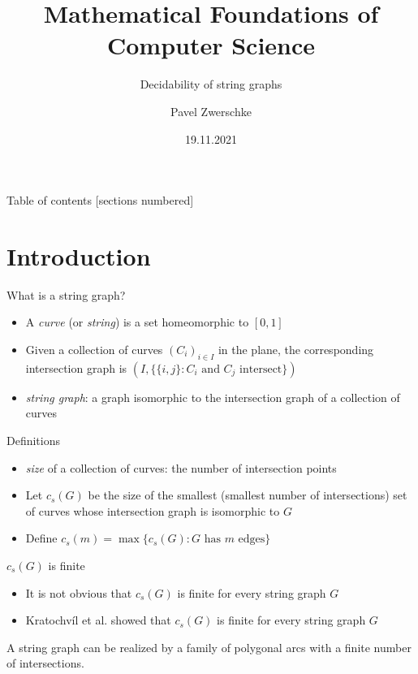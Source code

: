 \documentclass[10pt,aspectratio=169]{beamer}
\title{Mathematical Foundations of Computer Science}
\subtitle{Decidability of string graphs}
\date{19.11.2021}
\author{Pavel Zwerschke}
\institute{Radboud University Nijmegen}
\theoremstyle{plain} %
\theoremstyle{remark} %
\newcommand{\set}[1]{\{#1\}}
\begin{document}
\maketitle

\begin{frame}{Table of contents}
    [sections numbered]
    \tableofcontents%
\end{frame}

\section{Introduction}

\begin{frame}{What is a string graph?}
    \begin{itemize}
        \item A \textit{curve} (or \textit{string}) is a set homeomorphic to \([0,1]\)
        \item Given a collection of curves \((C_i)_{i \in I}\) in the plane, the corresponding intersection graph is \( (I, \set{\set{i, j} : C_i \text{ and } C_j \text{ intersect}}) \)
        \item \textit{string graph}: a graph isomorphic to the intersection graph of a collection of curves 
    \end{itemize}
\end{frame}

\begin{frame}{Definitions}
    \begin{itemize}
        \item \textit{size} of a collection of curves: the number of intersection points
        \item Let \(c_s(G)\) be the size of the smallest (smallest number of intersections) set of curves whose intersection graph is isomorphic to \(G\)
        \item Define \(c_s(m) = \max\set{c_s(G) : G \text{ has } m \text{ edges}}\)
    \end{itemize}
\end{frame}

\begin{frame}{\(c_s(G)\) is finite}
    \begin{itemize}
        \item It is not obvious that \(c_s(G)\) is finite for every string graph \(G\)
        \item Kratochvíl et al. showed that \(c_s(G)\) is finite for every string graph \(G\)
    \end{itemize}
    \begin{lemma}
        A string graph can be realized by a family of polygonal arcs with a finite number of intersections.
    \end{lemma}
\end{frame}
\end{document}
